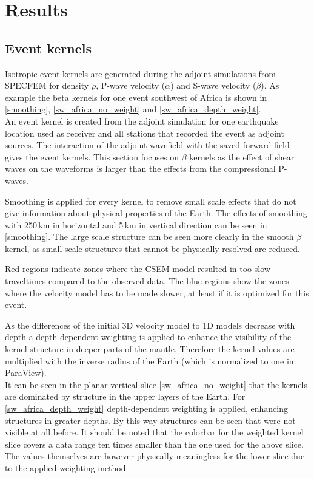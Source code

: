 
\chapter{Results}

\section{Event kernels}

Isotropic event kernels are generated during the adjoint simulations from SPECFEM for density $\rho$, P-wave velocity ($\alpha$) 
and S-wave velocity ($\beta$). As example the beta kernels for one event southwest of Africa is shown in \autoref{smoothing},
\autoref{sw_africa_no_weight} and \autoref{sw_africa_depth_weight}. \\
%
An event kernel is created from the adjoint simulation for one earthquake location used as receiver and 
all stations that recorded the event as adjoint sources. 
The interaction of the adjoint wavefield with the saved forward field gives the event kernels.
%
This section focuses on $\beta$ kernels as the effect of shear waves on the waveforms is larger than the effects
from the compressional P-waves.

Smoothing is applied for every kernel to remove small scale effects that do not give information about physical 
properties of the Earth.
The effects of smoothing with 250$\,$km in horizontal and 5$\,$km in vertical direction can be seen
in \autoref{smoothing}. The large scale structure can be seen more clearly in the smooth $\beta$ kernel, as
small scale structures that cannot be physically resolved are reduced.

Red regions indicate zones where the CSEM model resulted in too slow traveltimes compared to the observed data.
The blue regions show the zones where the velocity model has to be made slower, at least if it is 
optimized for this event.

As the differences of the initial 3D velocity model to 1D models decrease with depth a depth-dependent
weighting is applied to enhance the visibility of the kernel structure in deeper parts of the mantle.
Therefore the kernel values are multiplied with the inverse radius of the Earth (which is normalized to one
in ParaView). \\
%
It can be seen in the planar vertical slice \autoref{sw_africa_no_weight} that the kernels are dominated 
by structure in the upper layers of the Earth. 
For \autoref{sw_africa_depth_weight} depth-dependent weighting is applied, 
enhancing structures in greater depths. 
By this way structures can be seen that were not visible at all before.
It should be noted that the colorbar for the weighted kernel slice covers a data range
ten times smaller than the one used for the above slice.
The values themselves are however physically meaningless for the lower slice due to the 
applied weighting method.



